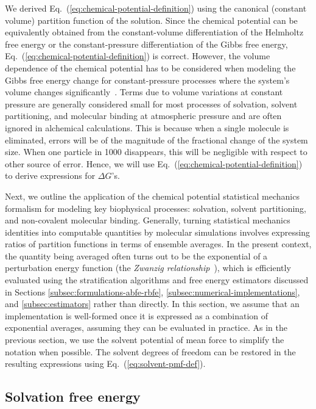 \documentclass[9pt,bestpractices]{livecoms}
\begin{document}
We derived Eq.~(\ref{eq:chemical-potential-definition}) using the canonical (constant volume) partition function of the solution. Since the chemical potential can be equivalently obtained from the constant-volume differentiation of the Helmholtz free energy or the constant-pressure differentiation of the Gibbs free energy, Eq.~(\ref{eq:chemical-potential-definition}) is correct. However, the volume dependence of the chemical potential has to be considered when modeling the Gibbs free energy change for constant-pressure processes where the system's volume changes significantly~\cite{gilson1997statisticalthermodynamic}. Terms due to volume variations at constant pressure are generally considered small for most processes of solvation, solvent partitioning, and molecular binding at atmospheric pressure and are often ignored in alchemical calculations.  This is because when a single molecule is eliminated, errors will be of the magnitude of the fractional change of the system size.  When one particle in 1000 disappears, this will be negligible with respect to other source of error. Hence, we will use Eq.~(\ref{eq:chemical-potential-definition}) to derive expressions for $\Delta G$'s.

Next, we outline the application of the chemical potential statistical mechanics formalism for modeling key biophysical processes: solvation, solvent partitioning, and non-covalent molecular binding. Generally, turning statistical mechanics identities into computable quantities by molecular simulations involves expressing ratios of partition functions in terms of ensemble averages. In the present context, the quantity being averaged often turns out to be the exponential of a perturbation energy function (the \textit{Zwanzig relationship}~\cite{zwanzig1954hightemperature}), which is efficiently evaluated using the stratification algorithms and free energy estimators discussed in Sections \ref{subsec:formulations-abfe-rbfe}, \ref{subsec:numerical-implementations},  and \ref{subsec:estimators} rather than directly. In this section, we assume that an implementation is well-formed once it is expressed as a combination of exponential averages, assuming they can be evaluated in practice. As in the previous section, we use the solvent potential of mean force to simplify the notation when possible. The solvent degrees of freedom can be restored  in the resulting expressions using Eq.~(\ref{eq:solvent-pmf-def}). 

\subsection{Solvation free energy}\label{sec:theory-solvation}
\end{document}
